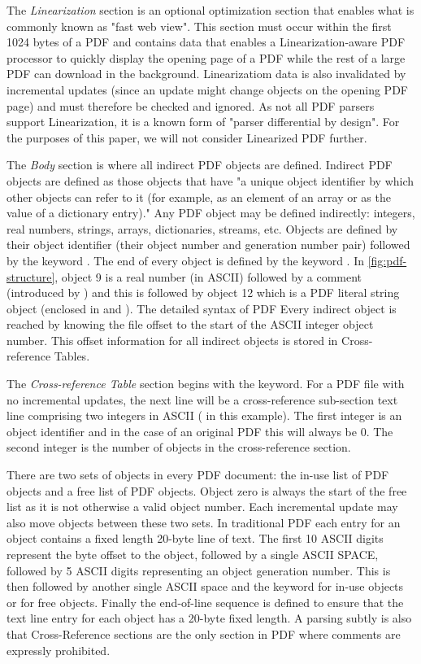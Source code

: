 The \emph{Linearization} section is an optional optimization section that enables what is commonly
known as "fast web view". This section must occur within the first 1024 bytes of a PDF and contains
data that enables a Linearization-aware PDF processor to quickly display the opening page of a PDF
while the rest of a large PDF can download in the background.
Linearizatiom data is also invalidated by incremental updates (since an update might change objects
on the opening PDF page) and must therefore be checked and ignored.
As not all PDF parsers support Linearization, it is a known form of "parser differential by design". 
For the purposes of this paper, we will not consider Linearized PDF further.

The \emph{Body} section is where all indirect PDF objects are defined. Indirect PDF objects
are defined as those objects that have "a unique object identifier by which other objects can
refer to it (for example, as an element of an array or as the value of a dictionary entry)."
Any PDF object may be defined indirectly: integers, real numbers, strings, arrays, dictionaries, 
streams, etc. Objects are defined by their object identifier (their object number and generation 
number pair) followed by the keyword . 
The end of every object is defined by the keyword .
In \cref{fig:pdf-structure}, object 9 is a real number (in ASCII) followed by a comment
(introduced by \lstcd{\%}) and this is followed by object 12 which is a PDF literal string object
(enclosed in \lstcd{(} and \lstcd{)}). The detailed syntax of PDF  
Every indirect object is reached by knowing the file offset to the start of the ASCII integer 
object number. This offset information for all indirect objects is stored in Cross-reference Tables.

The \emph{Cross-reference Table} section begins with the  keyword. For a PDF file
with no incremental updates, the next line will be a cross-reference sub-section text line comprising
two integers in ASCII ( in this example). The first integer is an object identifier 
and in the case of an original PDF this will always be 0. The second integer is the number of
objects in the cross-reference section.

There are two sets of
objects in every PDF document: the in-use list of PDF objects and a free list
of PDF objects. Object zero is always the start of the free list as it is not
otherwise a valid object number. Each incremental update may also move objects between these two sets.
In traditional PDF each entry for an object contains a fixed length 20-byte line of text.
The first 10 ASCII digits represent the byte offset to the object, followed by a single ASCII SPACE, 
followed by 5 ASCII digits representing an object generation number. This is then followed by
another single ASCII space and the keyword  for in-use objects or  for free objects.
Finally the end-of-line sequence is defined to ensure that the text line entry for each object has 
a 20-byte fixed length. A parsing subtly is also that Cross-Reference sections are the only section in PDF where comments are expressly prohibited.

